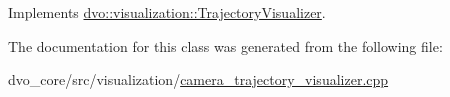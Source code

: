 Implements \mbox{\hyperlink{classdvo_1_1visualization_1_1_trajectory_visualizer_ac41106ae7e28c019b03f0aa210c6f0c1}{dvo\+::visualization\+::\+Trajectory\+Visualizer}}.



The documentation for this class was generated from the following file\+:\begin{DoxyCompactItemize}
\item 
dvo\+\_\+core/src/visualization/\mbox{\hyperlink{camera__trajectory__visualizer_8cpp}{camera\+\_\+trajectory\+\_\+visualizer.\+cpp}}\end{DoxyCompactItemize}
